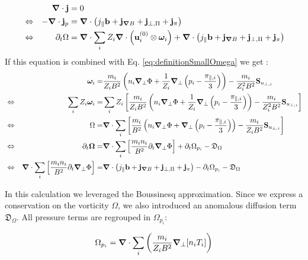  \begin{align}
 	&& \grad\cdot\mathbf{j} &= 0 \nonumber \\
 	&\Leftrightarrow& -\grad\cdot\mathbf{j}_p &= \grad\cdot\left(j_\parallel\mathbf{b} + \mathbf{j}_{\grad B} + \mathbf{j}_{\perp,\Pi} + \mathbf{j}_{\pi} \right) \nonumber \\
 	&\Leftrightarrow& \partial_t\Omega &= \grad\cdot\sum_{i}Z_i\grad\cdot\left(\mathbf{u}^{(0)}_i\otimes\boldsymbol{\omega}_i\right) +\grad\cdot\left(j_\parallel\mathbf{b} + \mathbf{j}_{\grad B} + \mathbf{j}_{\perp,\Pi} + \mathbf{j}_{\pi} \right)
 	\label{eq:TransportEquationVorticity}
 \end{align}
If this equation is combined with Eq. \ref{eq:definitionSmallOmega} we get :
 \begin{align}
 	&& \boldsymbol{\omega}_i =& \frac{m_i}{Z_iB^2}\left(n_i\grad_\perp\Phi + \frac{1}{Z_i}\grad_{\perp}\left(p_i-\frac{\pi_{\parallel,i}}{3}\right)\right) - \frac{m_i}{Z_i^2B^2}\mathbf{S}_{u_{\perp,i}} \nonumber\\
	&\Leftrightarrow& \sum_{i}Z_i\boldsymbol{\omega}_i =& \sum_{i}Z_i\left[\frac{m_i}{Z_i B^2}\left(n_i\grad_\perp\Phi + \frac{1}{Z_i}\grad_{\perp}\left(p_i-\frac{\pi_{\parallel,i}}{3}\right)\right) - \frac{m_i}{Z_i^2B^2}\mathbf{S}_{u_{\perp,i}}\right] \nonumber\\
	&\Leftrightarrow& \Omega =& \grad\cdot\sum_{i}\left[\frac{m_i}{ B^2}\left(n_i\grad_\perp\Phi + \grad_{\perp}\left(p_i-\frac{\pi_{\parallel,i}}{3}\right)\right) - \frac{m_i}{Z_i B^2}\mathbf{S}_{u_{\perp,i}}\right] \nonumber \\
	&\Leftrightarrow& \partial_t\mathbf{\Omega} =& \grad\cdot\sum_{i}\left[\frac{m_i n_i}{ B^2}\partial_t\grad_\perp\Phi\right] + \partial_t \Omega_{p_i} - \mathfrak{D}_\Omega \nonumber \\
	&\Leftrightarrow& \grad\cdot\sum_{i}\left[\frac{m_i n_i}{ B^2}\partial_t\grad_\perp\Phi\right]  =&  \grad\cdot\left(j_\parallel\mathbf{b} + \mathbf{j}_{\grad B} + \mathbf{j}_{\perp,\Pi} + \mathbf{j}_{\pi}\right) - \partial_t \Omega_{p_i} - \mathfrak{D}_\Omega \label{eq:FirstFormVorticityEquation}
 \end{align}
 
In this calculation we leveraged the Boussinesq approximation. Since we express a conservation on the vorticity $\Omega$, we also introduced an anomalous diffusion term $\mathfrak{D}_\Omega$. All pressure terms are regrouped in $\Omega_{p_i}$:

\begin{equation}
	\Omega_{p_i} = \grad\cdot\sum_{i}\left(\frac{m_i}{Z_i B^2}\grad_\perp[n_i T_i]\right)
\end{equation}


